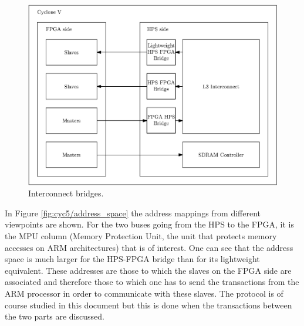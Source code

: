 \begin{figure}[H]
    \centering
    \includegraphics[scale=0.6]{Chapter1-Hardware/res/cycv_interconnect}
    \caption{Interconnect bridges.}
    \label{fig:cyc5/interconnect}
\end{figure}

In Figure \ref{fig:cyc5/address_space} the address mappings from different viewpoints are shown. For 
the two buses going from the HPS to the FPGA, it is the MPU column (Memory Protection Unit, the unit 
that protects memory accesses on ARM architectures) that is of interest. One can see that the address 
space is much larger for the HPS-FPGA
bridge than for its lightweight equivalent. These addresses 
are those to which the slaves on the FPGA side are associated and therefore those to which one
has to send the transactions from the ARM processor in order to communicate with these slaves. 
The protocol is of course studied in this document but this is done when the transactions 
between the two parts are discussed.


